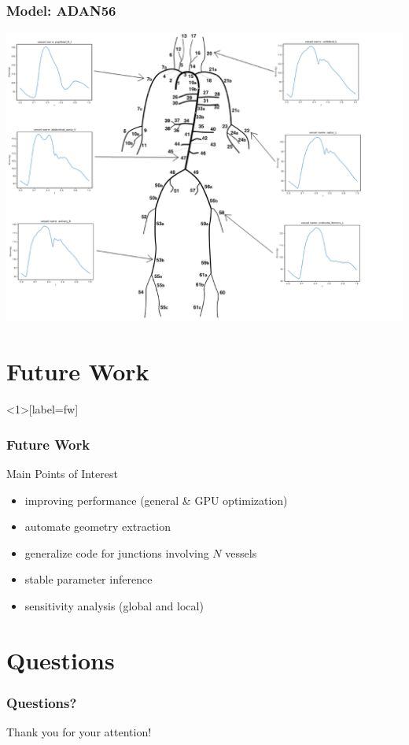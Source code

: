 \documentclass{beamer}
\begin{document}
\begin{frame}
	\frametitle{Model: ADAN56}
	\includegraphics[width=\textwidth]{images/adan56.eps}
\end{frame}


\section{Future Work}
\begin{frame}<1>[label=fw]
	\frametitle{Future Work}
	\begin{block}{Main Points of Interest}
		\begin{itemize}
			\item<2-> improving performance (general \& GPU optimization)
			\item<3-> automate geometry extraction
			\item<4-> generalize code for junctions involving $N$ vessels
			\item<5-> stable parameter inference
			\item<6-> sensitivity analysis (global and local)
		\end{itemize}
	\end{block}
	\vspace{5mm}
\end{frame}


\section{Questions}
\begin{frame}
	\frametitle{Questions?}
	Thank you for your attention!
\end{frame}
\end{document}
